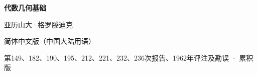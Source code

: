 \documentclass[12pt,twoside,openany]{book}
\begin{document}
\frontmatter
\begin{titlepage}
  \centering
  \vspace*{0.16\textheight}
  {\Huge\bfseries 代数几何基础\par}
  \vspace{1.2\baselineskip}
  {\Large 亚历山大·格罗滕迪克\par}
  \vfill
  {\large 简体中文版（中国大陆用语）\par}
  \vspace{0.5\baselineskip}
  {\normalsize 第149、182、190、195、212、221、232、236次报告、1962年评注及勘误 · 累积版\par}
\end{titlepage}

\tableofcontents
\mainmatter

















\end{document}
